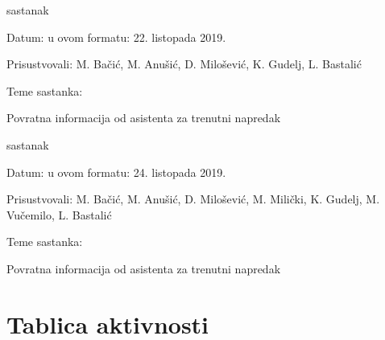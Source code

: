 \begin{packed_enum}
			\item  sastanak
			\item[] \begin{packed_item}
				\item Datum: u ovom formatu: 22. listopada 2019.
				\item Prisustvovali: M. Bačić, M. Anušić, D. Milošević, K. Gudelj, L. Bastalić
				\item Teme sastanka:
				\begin{packed_item}
					\item  Povratna informacija od asistenta za trenutni napredak
				\end{packed_item}
			\end{packed_item}
		
			\item  sastanak
			\item[] \begin{packed_item}
				\item Datum: u ovom formatu: 24. listopada 2019.
				\item Prisustvovali:  M. Bačić, M. Anušić, D. Milošević, M. Milički, K. Gudelj, M. Vučemilo, L. Bastalić
				\item Teme sastanka:
				\begin{packed_item}
					\item  Povratna informacija od asistenta za trenutni napredak
				\end{packed_item}
			\end{packed_item}
			
			
		\end{packed_enum}
		
		\eject
		\section*{Tablica aktivnosti}
		
